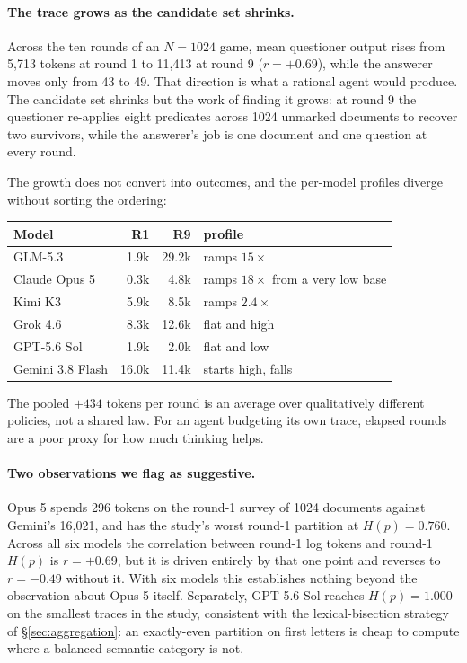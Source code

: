 \documentclass[11pt]{article}
\begin{document}
\paragraph{The trace grows as the candidate set shrinks.} Across the ten rounds
of an $N{=}1024$ game, mean questioner output rises from 5{,}713 tokens at round
1 to 11{,}413 at round 9 ($r=+0.69$), while the answerer moves only from 43 to
49. That direction is what a rational agent would produce. The candidate set
shrinks but the work of finding it grows: at round 9 the questioner re-applies
eight predicates across 1024 unmarked documents to recover two survivors, while
the answerer's job is one document and one question at every round.

The growth does not convert into outcomes, and the per-model profiles diverge
without sorting the ordering:

\begin{center}\small
\begin{tabular}{lrrl}
\toprule
Model & R1 & R9 & profile \\
\midrule
GLM-5.3          &  1.9k & 29.2k & ramps $15\times$ \\
Claude Opus 5    &  0.3k &  4.8k & ramps $18\times$ from a very low base \\
Kimi K3          &  5.9k &  8.5k & ramps $2.4\times$ \\
Grok 4.6         &  8.3k & 12.6k & flat and high \\
GPT-5.6 Sol      &  1.9k &  2.0k & flat and low \\
Gemini 3.8 Flash & 16.0k & 11.4k & starts high, falls \\
\bottomrule
\end{tabular}
\end{center}

The pooled $+434$ tokens per round is an average over qualitatively different
policies, not a shared law. For an agent budgeting its own trace, elapsed rounds
are a poor proxy for how much thinking helps.

\paragraph{Two observations we flag as suggestive.} Opus 5 spends 296 tokens on
the round-1 survey of 1024 documents against Gemini's 16{,}021, and has the
study's worst round-1 partition at $H(p)=0.760$. Across all six models the
correlation between round-1 log tokens and round-1 $H(p)$ is $r=+0.69$, but it
is driven entirely by that one point and reverses to $r=-0.49$ without it. With
six models this establishes nothing beyond the observation about Opus 5 itself.
Separately, GPT-5.6 Sol reaches $H(p)=1.000$ on the smallest traces in the
study, consistent with the lexical-bisection strategy of
\S\ref{sec:aggregation}: an exactly-even partition on first letters is cheap to
compute where a balanced semantic category is not.
\end{document}
